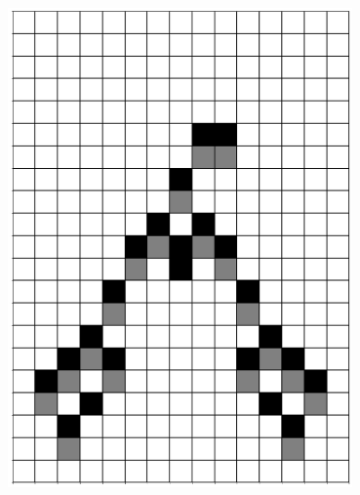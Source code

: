 \documentclass[12pt]{article}
\numberwithin{figure}{section} %
\begin{document}
\begin{figure}[H]
\begin{subfigure}{0.19\textwidth}
     \subcaption{}
   \end{subfigure}
      \newline
   \setcounter{subfigure}{0}
     \begin{subfigure}{0.19\textwidth}
     \centering
     \includegraphics[width=\linewidth]{Section4/26.0}
     \subcaption{}
   \end{subfigure}
     \begin{subfigure}{0.19\textwidth}
     \centering

\end{subfigure}
\end{figure}
\end{document}

